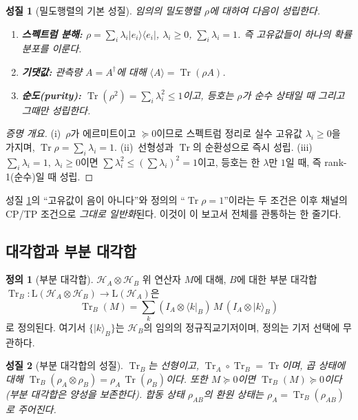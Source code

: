 \documentclass[11pt,a4paper]{article}
\newcommand{\Hcal}{\mathcal{H}}
\newcommand{\Tr}{\operatorname{Tr}}
\newcommand{\Lin}{\mathrm{L}}
\theoremstyle{definition}
\newtheorem{definition}{정의}[section]
\theoremstyle{plain}
\newtheorem{property}{성질}[section]
\theoremstyle{remark}
\begin{document}
\begin{property}[밀도행렬의 기본 성질]\label{prop:density}
임의의 밀도행렬 $\rho$에 대하여 다음이 성립한다.
\begin{enumerate}[label=\textup{(\roman*)}]
  \item \textbf{스펙트럼 분해:} $\rho=\sum_i \lambda_i|e_i\rangle\langle e_i|$, $\lambda_i\ge0$, $\sum_i\lambda_i=1$. 즉 고유값들이 하나의 확률분포를 이룬다.
  \item \textbf{기댓값:} 관측량 $A=A^\dagger$에 대해 $\langle A\rangle=\Tr(\rho A)$.
  \item \textbf{순도(purity):} $\Tr(\rho^2)=\sum_i\lambda_i^2\le1$이고, 등호는 $\rho$가 순수 상태일 때 그리고 그때만 성립한다.
\end{enumerate}
\end{property}

\begin{proof}[증명 개요]
(i)~$\rho$가 에르미트이고 $\succeq0$이므로 스펙트럼 정리로 실수 고유값 $\lambda_i\ge0$을 가지며, $\Tr\rho=\sum_i\lambda_i=1$. (ii)~선형성과 $\Tr$의 순환성으로 즉시 성립. (iii)~$\sum_i\lambda_i=1,\ \lambda_i\ge0$이면 $\sum\lambda_i^2\le(\sum\lambda_i)^2=1$이고, 등호는 한 $\lambda$만 $1$일 때, 즉 rank-1(순수)일 때 성립.
\end{proof}

성질 \ref{prop:density}의 ``고유값이 음이 아니다''와 정의의 ``$\Tr\rho=1$''이라는 두 조건은 이후 채널의 CP/TP 조건으로 \emph{그대로 일반화}된다. 이것이 이 보고서 전체를 관통하는 한 줄기다.

\subsection{대각합과 부분 대각합}

\begin{definition}[부분 대각합]
$\Hcal_A\otimes\Hcal_B$ 위 연산자 $M$에 대해, $B$에 대한 부분 대각합 $\Tr_B:\Lin(\Hcal_A\otimes\Hcal_B)\to\Lin(\Hcal_A)$은
\[
\Tr_B(M)=\sum_{k}(I_A\otimes\langle k|_B)\,M\,(I_A\otimes|k\rangle_B)
\]
로 정의된다. 여기서 $\{|k\rangle_B\}$는 $\Hcal_B$의 임의의 정규직교기저이며, 정의는 기저 선택에 무관하다.
\end{definition}

\begin{property}[부분 대각합의 성질]
$\Tr_B$는 선형이고, $\Tr_A\circ\Tr_B=\Tr$이며, 곱 상태에 대해 $\Tr_B(\rho_A\otimes\rho_B)=\rho_A\,\Tr(\rho_B)$이다. 또한 $M\succeq0$이면 $\Tr_B(M)\succeq0$이다(부분 대각합은 양성을 보존한다). 합동 상태 $\rho_{AB}$의 환원 상태는 $\rho_A=\Tr_B(\rho_{AB})$로 주어진다.
\end{property}
\end{document}
